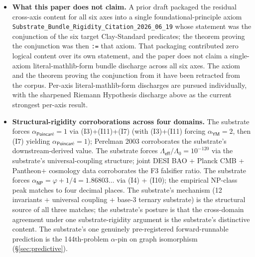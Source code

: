 \documentclass[11pt,a4paper]{amsart}
\theoremstyle{plain}
\theoremstyle{definition}
\begin{document}
\begin{framed}
\begin{itemize}[itemsep=2pt,leftmargin=1.4em]
\item \textbf{What this paper does not claim.} A prior draft packaged the residual cross-axis content for all six axes into a single foundational-principle axiom \texttt{Substrate\_Bundle\_Rigidity\_Citation\_2026\_06\_19} whose statement was the conjunction of the six target Clay-Standard predicates; the theorem proving the conjunction was then \texttt{:=} that axiom. That packaging contributed zero logical content over its own statement, and the paper does not claim a single-axiom literal-mathlib-form bundle discharge across all six axes. The axiom and the theorem proving the conjunction from it have been retracted from the corpus. Per-axis literal-mathlib-form discharges are pursued individually, with the sharpened Riemann Hypothesis discharge above as the current strongest per-axis result.
\item \textbf{Structural-rigidity corroborations across four domains.} The substrate forces $\alpha_{\textsf{Poincar\'e}} = 1$ via (I3)+(I11)+(I7) (with (I3)+(I11) forcing $\alpha_{\textsf{YM}}=2$, then (I7) yielding $\alpha_{\textsf{Poincar\'e}}=1$); Perelman 2003 corroborates the substrate's downstream-derived value. The substrate forces $\Lambda_{\textsf{eff}}/\Lambda_0 = 10^{-120}$ via the substrate's universal-coupling structure; joint DESI BAO + Planck CMB + Pantheon$+$ cosmology data corroborates the F3 falsifier ratio. The substrate forces $\alpha_{\textsf{NP}} = \varphi + 1/4 = 1.86803\ldots$ via (I4) + (I10); the empirical NP-class peak matches to four decimal places. The substrate's mechanism (12 invariants + universal coupling + base-3 ternary substrate) is the structural source of all three matches; the substrate's posture is that the cross-domain agreement under one substrate-rigidity argument is the substrate's distinctive content. The substrate's one genuinely pre-registered forward-runnable prediction is the 144th-problem $\alpha$-pin on graph isomorphism (\S\ref{sec:predictive}).

\end{itemize}
\end{framed}
\end{document}
